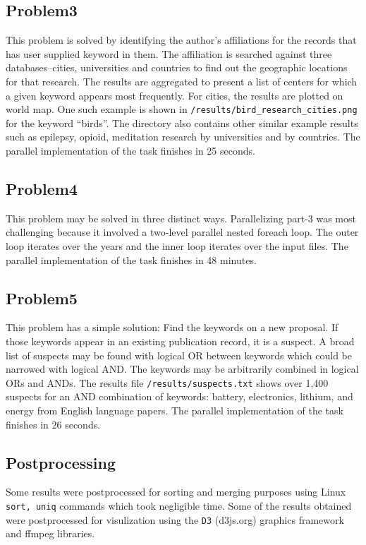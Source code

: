\documentclass{article}
\begin{document}
\subsection*{Problem3}
This problem is solved by identifying the author's affiliations for the records
that has user supplied keyword in them. The affiliation is searched against
three databases--cities, universities and countries to find out the geographic
locations for that research. The results are aggregated to present a list of
centers for which a given keyword appears most frequently. For cities, the
results are plotted on world map. One such example is shown in
\texttt{/results/bird\_research\_cities.png} for the keyword ``birds''. The
directory also contains other similar example results such as epilepsy, opioid,
meditation research by universities and by countries. The parallel
implementation of the task finishes in 25 seconds.

\subsection*{Problem4}
This problem may be solved in three distinct ways. Parallelizing part-3 was
most challenging because it involved a two-level parallel nested foreach loop.
The outer loop iterates over the years and the inner loop iterates over the
input files. The parallel implementation of the task finishes in 48 minutes.

\subsection*{Problem5}
This problem has a simple solution: Find the keywords on a new proposal. If
those keywords appear in an existing publication record, it is a suspect. A
broad list of suspects may be found with logical OR between keywords which
could be narrowed with logical AND. The keywords may be arbitrarily combined in
logical ORs and ANDs. The results file \texttt{/results/suspects.txt} shows
over 1,400 suspects for an AND combination of keywords:  battery, electronics,
lithium, and energy from English language papers. The parallel implementation
of the task finishes in 26 seconds.

\subsection*{Postprocessing}
Some results were postprocessed for sorting and merging purposes using Linux
\texttt{sort, uniq} commands which took negligible time. Some of the results
obtained were postprocessed for visulization using the \texttt{D3} (d3js.org)
graphics framework and ffmpeg libraries.
\end{document}
